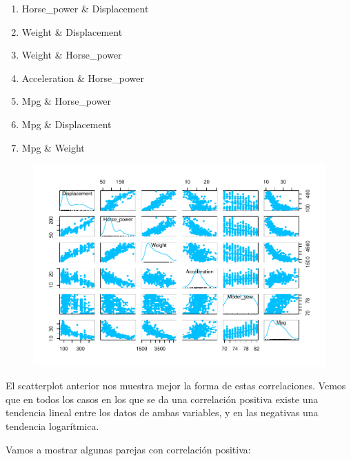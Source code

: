 \begin{enumerate}
    \def\labelenumi{\arabic{enumi}.}
    \item   Horse\_power \& Displacement
    \item   Weight \& Displacement
    \item   Weight \& Horse\_power
    \item   Acceleration \& Horse\_power
    \item   Mpg \& Horse\_power
    \item   Mpg \& Displacement
    \item   Mpg \& Weight
\end{enumerate}

\begin{figure}[H]\includegraphics[width=.9\linewidth]{img/EDA_files/figure-latex/unnamed-chunk-20-1} \caption{}\end{figure}

El scatterplot anterior nos muestra mejor la forma de estas correlaciones. Vemos que en todos los casos en los que se da una correlación positiva existe una tendencia lineal entre los datos de ambas variables, y en las negativas una tendencia logarítmica.

\newpage

Vamos a mostrar algunas parejas con correlación positiva:

